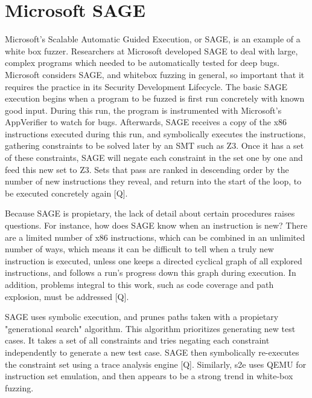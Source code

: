 \documentclass[11pt,expanded,copyright]{fsuthesis}
\begin{document}


\section{Microsoft SAGE}

Microsoft's Scalable Automatic Guided Execution, or SAGE, is an example of a white box fuzzer. Researchers at Microsoft developed SAGE to deal with large, complex programs which needed to be automatically tested for deep bugs. Microsoft considers SAGE, and whitebox fuzzing in general, so important that it requires the practice in its Security Development Lifecycle. The basic SAGE execution begins when a program to be fuzzed is first run concretely with known good input. During this run, the program is instrumented with Microsoft's AppVerifier to watch for bugs. Afterwards, SAGE receives a copy of the x86 instructions executed during this run, and symbolically executes the instructions, gathering constraints to be solved later by an SMT such as Z3. Once it has a set of these constraints, SAGE will negate each constraint in the set one by one and feed this new set to Z3. Sets that pass are ranked in descending order by the number of new instructions they reveal, and return into the start of the loop, to be executed concretely again [Q].

Because SAGE is propietary, the lack of detail about certain procedures raises questions. For instance, how does SAGE know when an instruction is new? There are a limited number of x86 instructions, which can be combined in an unlimited number of ways, which means it can be difficult to tell when a truly new instruction is executed, unless one keeps a directed cyclical graph of all explored instructions, and follows a run's progress down this graph during execution. In addition, problems integral to this work, such as code coverage and path explosion, must be addressed [Q].

SAGE uses symbolic execution, and prunes paths taken with a propietary "generational search" algorithm. This algorithm prioritizes generating new test cases. It takes a set of all constraints and tries negating each constraint independently to generate a new test case. SAGE then symbolically re-executes the constraint set using a trace analysis engine [Q]. Similarly, s2e uses QEMU for instruction set emulation, and then appears to be a strong trend in white-box fuzzing.
\end{document}
